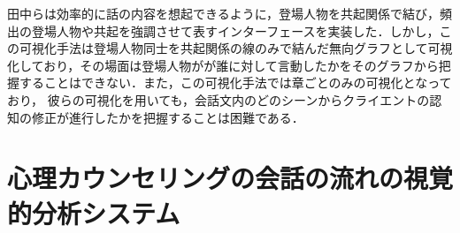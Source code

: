 \documentclass[shuuron]{kuee}
\begin{document}
田中ら\cite{tanaka}は効率的に話の内容を想起できるように，登場人物を共起関係で結び，頻出の登場人物や共起を強調させて表すインターフェースを実装した．しかし，この可視化手法は登場人物同士を共起関係の線のみで結んだ無向グラフとして可視化しており，その場面は登場人物がが誰に対して言動したかをそのグラフから把握することはできない．また，この可視化手法では章ごとのみの可視化となっており， 彼らの可視化を用いても，会話文内のどのシーンからクライエントの認知の修正が進行したかを把握することは困難である．





























\chapter{心理カウンセリングの会話の流れの視覚的分析システム} %
\end{document}
